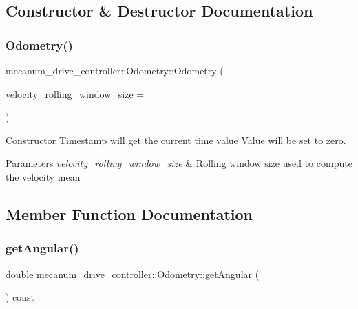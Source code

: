 \subsection{Constructor \& Destructor Documentation}
\mbox{\label{classmecanum__drive__controller_1_1Odometry_a1ee869a418151783f8283e0911073c94}} 
\subsubsection{\texorpdfstring{Odometry()}{Odometry()}}
{\footnotesize\ttfamily mecanum\+\_\+drive\+\_\+controller\+::\+Odometry\+::\+Odometry (\begin{DoxyParamCaption}\item[{size\+\_\+t}]{velocity\+\_\+rolling\+\_\+window\+\_\+size = {} }\end{DoxyParamCaption})}



Constructor Timestamp will get the current time value Value will be set to zero. 


\begin{DoxyParams}{Parameters}
{\em velocity\+\_\+rolling\+\_\+window\+\_\+size} & Rolling window size used to compute the velocity mean \\
\hline
\end{DoxyParams}


\subsection{Member Function Documentation}
\mbox{\label{classmecanum__drive__controller_1_1Odometry_aede4d8f9fccf9c6b5ff41f035f383a0f}} 
\subsubsection{\texorpdfstring{get\+Angular()}{getAngular()}}
{\footnotesize\ttfamily double mecanum\+\_\+drive\+\_\+controller\+::\+Odometry\+::get\+Angular (\begin{DoxyParamCaption}{ }\end{DoxyParamCaption}) const\hspace{0.3cm}{\ttfamily [inline]}}



